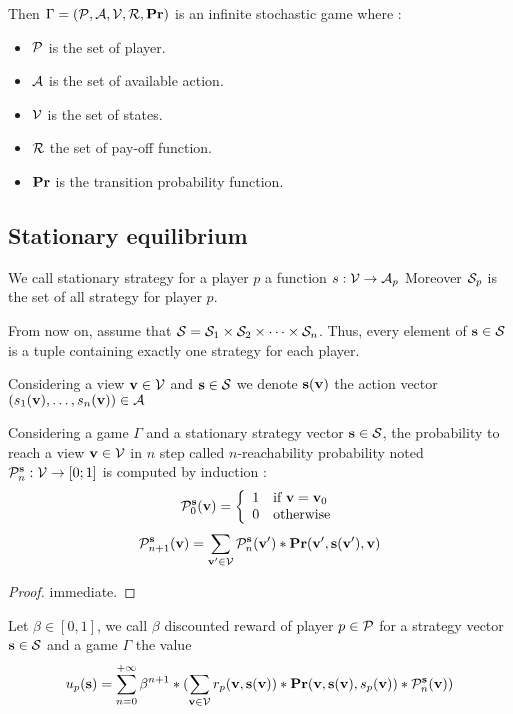 Then $\Gamma = (\mathcal{P},\mathcal{A},\mathcal{V},\mathcal{R},\mathbf{Pr})$ is an infinite stochastic game where :
\begin{itemize}
	\item $\mathcal{P}$ is the set of player.
	\item $\mathcal{A}$ is the set of available action.
	\item $\mathcal{V}$ is the set of states.
	\item $\mathcal{R}$ the set of pay-off function.
	\item $\mathbf{Pr}$ is the transition probability function.
\end{itemize} 


\subsection{Stationary equilibrium}

\begin{mydef}
	We call stationary strategy for a player $p$ a function $s : \mathcal{V} \rightarrow \mathcal{A}_p$ 
	Moreover $\mathcal{S}_p$ is the set of all strategy for player $p$. 
\end{mydef}


From now on, assume that $\mathcal{S} = \mathcal{S}_{1} \times \mathcal{S}_{2} \times \cdots \times \mathcal{S}_{n}$. Thus, every element of $\mathbf{s} \in \mathcal{S}$ is a tuple containing exactly one strategy for each player.

Considering a view $\mathbf{v} \in \mathcal{V}$ and $\mathbf{s} \in \mathcal{S}$ we denote $\mathbf{s}(\mathbf{v})$ the action vector $(s_{1}(\mathbf{v}),\ldots,s_{n}(\mathbf{v})) \in \mathcal{A}$ 
\begin{myprop}
	Considering a game $\Gamma$ and a stationary strategy vector $\mathbf{s} \in \mathcal{S}$, 
	the probability to reach a view $\mathbf{v} \in \mathcal{V}$ in $n$ step called $n$-reachability probability noted $\mathcal{P}^{\mathbf{s}}_n : \mathcal{V} \rightarrow [0;1]$ is computed by induction :
	$$\mathcal{P}^{\mathbf{s}}_0(\mathbf{v}) = \left\{\begin{array}{ll}
	1 & \mbox{if } \mathbf{v} = \mathbf{v}_0 \\
	0 & \mbox{otherwise}
	\end{array}\right.$$
	$$\mathcal{P}^{\mathbf{s}}_{n+1}(\mathbf{v}) = \sum_{\mathbf{v}' \in \mathcal{V}} \mathcal{P}^{\mathbf{s}}_{n}(\mathbf{v}') * \mathbf{Pr}(\mathbf{v}',\mathbf{s}(\mathbf{v}'),\mathbf{v})$$
\end{myprop}

\begin{proof}
	immediate.
\end{proof}


\begin{mydef}
	Let $\beta \in [0,1]$, we call $\beta$ discounted reward of player $p \in \mathcal{P}$ for a strategy vector $\mathbf{s} \in \mathcal{S}$ and a game $\Gamma$ the value 
	$$u_p(\mathbf{s}) = 	\sum_{n=0}^{+\infty}\beta^{n+1} *  (\sum_{\mathbf{v}\in\mathcal{V}} r_p(\mathbf{v},\mathbf{s}(\mathbf{v}))*\mathbf{Pr}(\mathbf{v},\mathbf{s}(\mathbf{v}),s_p(\mathbf{v}))*\mathcal{P}^{\mathbf{s}}_{n}(\mathbf{v})) $$
\end{mydef}

